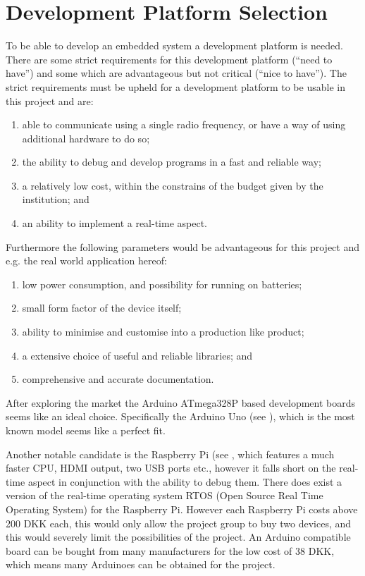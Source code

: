 
\section{Development Platform Selection}
To be able to develop an embedded system a development platform is needed. 
There are some strict requirements for this development platform (``need to have'') and some which are advantageous but not critical (``nice to have'').
The strict requirements must be upheld for a development platform to be usable in this project and are:

\begin{enumerate}[label=\itshape \alph*\upshape)]
\item able to communicate using a single radio frequency, or have a way of using additional hardware to do so;
\item the ability to debug and develop programs in a fast and reliable way;
\item a relatively low cost, within the constrains of the budget given by the institution;
and
\item an ability to implement a real-time aspect.
\end{enumerate}

Furthermore the following parameters would be advantageous for this project and e.g. the real world application hereof:
\begin{enumerate}[label=\itshape \alph*\upshape), resume]
\item low power consumption, and possibility for running on batteries;
\item small form factor of the device itself;
\item ability to minimise and customise into a production like product;
\item a extensive choice of useful and reliable libraries;
and
\item comprehensive and accurate documentation.
\end{enumerate}

\bigskip
After exploring the market the Arduino ATmega328P based development boards seems like an ideal choice.
Specifically the Arduino Uno (see \cite{ArduinoUNO}), which is the most known model seems like a perfect fit.

Another notable candidate is the Raspberry Pi (see \cite{RaspberryPI}, which features a much faster CPU, HDMI output, two USB ports etc., however it falls short on the real-time aspect in conjunction with the ability to debug them. 
There does exist a version of the real-time operating system RTOS (Open Source Real Time Operating System) for the Raspberry Pi.
However each Raspberry Pi costs above 200 DKK each, this would only allow the project group to buy two devices, and this would severely limit the possibilities of the project.
An Arduino compatible board can be bought from many manufacturers for the low cost of 38 DKK, which means many Arduinoes can be obtained for the project.

